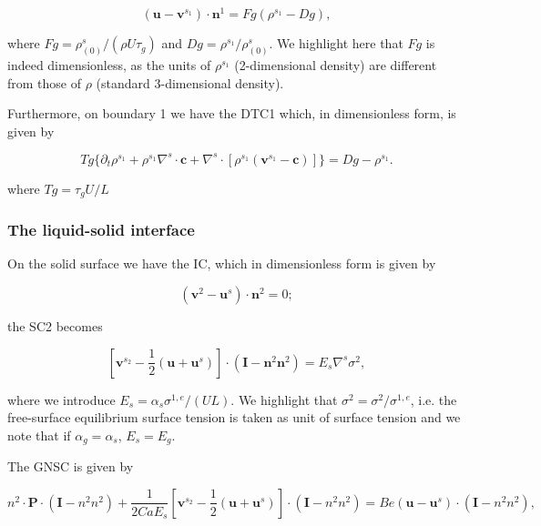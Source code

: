 \documentclass{article}
\begin{document}
\begin{equation}
(\pmb {u} - \pmb{v}^{s_1})\cdot \pmb{n}^1 = Fg(\rho^{s_1} - Dg), \tag{2.49}
\end{equation}

where \(Fg = \rho_{(0)}^{s} / (\rho U\tau_{g})\) and \(Dg = \rho^{s_1} / \rho_{(0)}^{s}\). We highlight here that \(Fg\) is indeed dimensionless, as the units of \(\rho^{s_1}\) (2-dimensional density) are different from those of \(\rho\) (standard 3-dimensional density).

Furthermore, on boundary 1 we have the DTC1 which, in dimensionless form, is given by

\begin{equation}
Tg\{\partial_t\rho^{s_1} + \rho^{s_1}\nabla^s\cdot \pmb {c} + \nabla^s\cdot [\rho^{s_1}(\pmb{v}^{s_1} - \pmb {c})]\} = Dg - \rho^{s_1}. \tag{2.50}
\end{equation}

where \(Tg = \tau_{g}U / L\)

\subsubsection{The liquid-solid interface}

On the solid surface we have the IC, which in dimensionless form is given by

\begin{equation}
\left(\pmb {v}^2 -\pmb {u}^s\right)\cdot \pmb{n}^2 = 0; \tag{2.51}
\end{equation}

the SC2 becomes

\begin{equation}
\left[\pmb{v}^{s_2} - \frac{1}{2} (\pmb {u} + \pmb{u}^s)\right]\cdot (\pmb {I} - \pmb{n}^2 \pmb{n}^2) = E_s \nabla^s \sigma^2, \tag{2.52}
\end{equation}

where we introduce \(E_{s} = \alpha_{s}\sigma^{1,e} / (UL)\). We highlight that \(\sigma^2 = \sigma^2 /\sigma^{1,e}\), i.e. the free-surface equilibrium surface tension is taken as unit of surface tension and we note that if \(\alpha_{g} = \alpha_{s}\), \(E_{s} = E_{g}\).

The GNSC is given by

\begin{equation}
n^2\cdot \pmb {P}\cdot (\pmb {I} - n^2 n^2) + \frac{1}{2CaE_s}\left[\pmb{v}^{s_2} - \frac{1}{2} (\pmb {u} + \pmb{u}^s)\right]\cdot (\pmb {I} - n^2 n^2) = B e(\pmb {u} - \pmb{u}^s)\cdot (\pmb {I} - n^2 n^2), \tag{2.53}
\end{equation}
\end{document}
